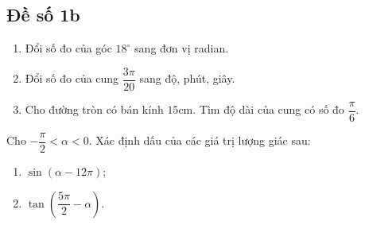 \subsection{Đề số 1b}
\setcounter{ex}{0}
\begin{ex}[1,0 điểm]%
	\begin{enumerate}
		\item Đổi số đo của góc $18^\circ$ sang đơn vị radian.
		\item Đổi số đo của cung $\dfrac{3 \pi}{20}$ sang độ, phút, giây.
		\item Cho đường tròn có bán kính $15$cm. Tìm độ dài của cung có số đo $\dfrac{\pi}{6}$.
	\end{enumerate}	
\end{ex}
\begin{ex}[2,0 điểm]%
	Cho $-\dfrac{\pi}{2} < \alpha < 0$. Xác định dấu của các giá trị lượng giác sau:
	\begin{enumerate}
		
		\item $\sin ( \alpha -12 \pi)$;
		
		\item $\tan \left( \dfrac{5 \pi}{2} - \alpha \right)$.
	\end{enumerate}
\end{ex}

